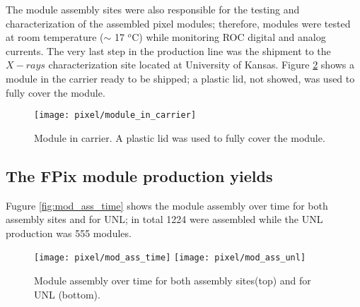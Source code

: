 The module assembly sites were also responsible for the testing and characterization of the assembled pixel modules; therefore, modules were tested at room temperature ($\sim$ 17 $^o$C) while monitoring ROC
digital and analog currents. The very last step in the production line was the shipment to the $X-rays$ characterization site located at University of Kansas. Figure \ref{fig:module_in_carrier} shows a module in the carrier ready to be shipped; a plastic lid, not showed, was used to fully cover the module.       

\begin{figure}[h]
\begin{center}
  \texttt{[image: pixel/module\_in\_carrier]}
 \caption[Module in carrier.]{Module in carrier. A plastic lid was used to fully cover the module.}\label{fig:module_in_carrier}
\end{center}
\end{figure}

\subsection{The FPix module production yields}

Fugure \ref{fig:mod_ass_time} shows the module assembly over time for both assembly sites and for UNL; in total 1224 were assembled while the UNL production was 555 modules.     


\begin{figure}[h]
\begin{center}
  \texttt{[image: pixel/mod\_ass\_time]}
  \texttt{[image: pixel/mod\_ass\_unl]}
 \caption[Module assembly over time.]{Module assembly over time for both assembly sites(top) and for UNL (bottom).}\label{fig:module_in_carrier}
\end{center}
\end{figure}
